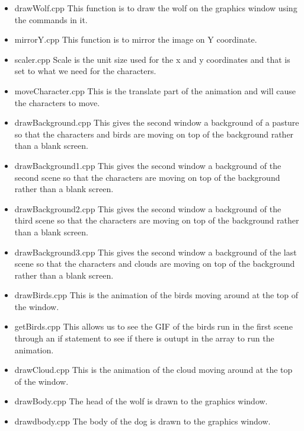 \documentclass{article}
\begin{document}
\begin{itemize}
	\item drawWolf.cpp  This function is to draw the wolf on the graphics window using
		the commands in it.

	\item mirrorY.cpp This function is to mirror the image on Y
         coordinate.
         
     \item scaler.cpp Scale is the unit size used for the x and y coordinates
		and that is set to what we need for the characters.
		
	\item moveCharacter.cpp This is the translate part of the animation and will cause the characters to move.
	
	\item drawBackground.cpp This gives the second window a background of a pasture so that the characters
	and birds are moving on top of the background rather than a blank screen.
	
	\item drawBackground1.cpp This gives the second window a background of the second scene so that the characters
are moving on top of the background rather than a blank screen. 
	
	\item drawBackground2.cpp This gives the second window a background of the third scene so that the characters
are moving on top of the background rather than a blank screen. 
	
	\item drawBackground3.cpp This gives the second window a background of the last scene so that the characters
and clouds are moving on top of the background rather than a blank screen. 
	
	\item drawBirds.cpp This is the animation of the birds moving around at the top of the window.
	
	\item getBirds.cpp This allows us to see the GIF of the birds run
	in the first scene through an if statement to see
	if there is outupt in the array to run the animation. 
	
	\item drawCloud.cpp This is the animation of the cloud moving around at the top of the window.
	
	\item drawBody.cpp The head of the wolf is drawn to the graphics window.
	
	\item drawdbody.cpp The body of the dog is drawn to the graphics window.
	

\end{itemize}
\end{document}
